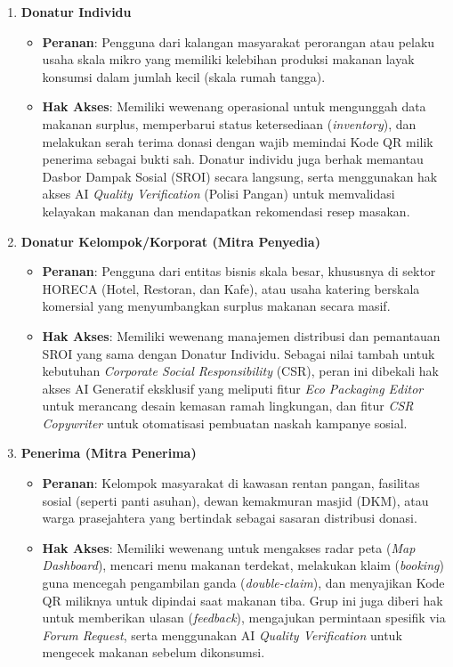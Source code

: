 \begin{enumerate}
    \item \textbf{Donatur Individu}
    \begin{itemize}
        \item \textbf{Peranan}: Pengguna dari kalangan masyarakat perorangan atau pelaku usaha skala mikro yang memiliki kelebihan produksi makanan layak konsumsi dalam jumlah kecil (skala rumah tangga).
        \item \textbf{Hak Akses}: Memiliki wewenang operasional untuk mengunggah data makanan surplus, memperbarui status ketersediaan (\textit{inventory}), dan melakukan serah terima donasi dengan wajib memindai Kode QR milik penerima sebagai bukti sah. Donatur individu juga berhak memantau Dasbor Dampak Sosial (SROI) secara langsung, serta menggunakan hak akses AI \textit{Quality Verification} (Polisi Pangan) untuk memvalidasi kelayakan makanan dan mendapatkan rekomendasi resep masakan.
    \end{itemize}

    \item \textbf{Donatur Kelompok/Korporat (Mitra Penyedia)}
    \begin{itemize}
        \item \textbf{Peranan}: Pengguna dari entitas bisnis skala besar, khususnya di sektor HORECA (Hotel, Restoran, dan Kafe), atau usaha katering berskala komersial yang menyumbangkan surplus makanan secara masif.
        \item \textbf{Hak Akses}: Memiliki wewenang manajemen distribusi dan pemantauan SROI yang sama dengan Donatur Individu. Sebagai nilai tambah untuk kebutuhan \textit{Corporate Social Responsibility} (CSR), peran ini dibekali hak akses AI Generatif eksklusif yang meliputi fitur \textit{Eco Packaging Editor} untuk merancang desain kemasan ramah lingkungan, dan fitur \textit{CSR Copywriter} untuk otomatisasi pembuatan naskah kampanye sosial.
    \end{itemize}

    \item \textbf{Penerima (Mitra Penerima)}
    \begin{itemize}
        \item \textbf{Peranan}: Kelompok masyarakat di kawasan rentan pangan, fasilitas sosial (seperti panti asuhan), dewan kemakmuran masjid (DKM), atau warga prasejahtera yang bertindak sebagai sasaran distribusi donasi.
        \item \textbf{Hak Akses}: Memiliki wewenang untuk mengakses radar peta (\textit{Map Dashboard}), mencari menu makanan terdekat, melakukan klaim (\textit{booking}) guna mencegah pengambilan ganda (\textit{double-claim}), dan menyajikan Kode QR miliknya untuk dipindai saat makanan tiba. Grup ini juga diberi hak untuk memberikan ulasan (\textit{feedback}), mengajukan permintaan spesifik via \textit{Forum Request}, serta menggunakan AI \textit{Quality Verification} untuk mengecek makanan sebelum dikonsumsi.
    \end{itemize}


\end{enumerate}
